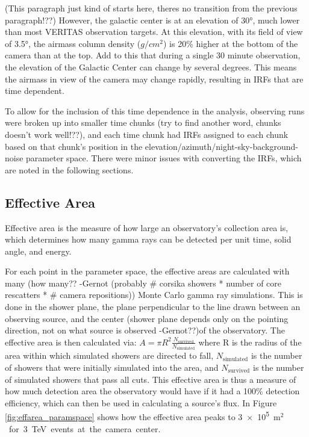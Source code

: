   {\color{red}(This paragraph just kind of starts here, theres no transition from the previous paragraph!??)}
  However, the galactic center is at an elevation of \ang{30}, much lower than most VERITAS observation targets.
  At this elevation, with its field of view of \ang{3.5}, the airmass column density ($g/cm^{2}$) is 20\% higher at the bottom of the camera than at the top.
  Add to this that during a single 30 minute observation, the elevation of the Galactic Center can change by several degrees.
  This means the airmass in view of the camera may change rapidly, resulting in IRFs that are time dependent.

  To allow for the inclusion of this time dependence in the analysis, observing runs were broken up into smaller time {\color{red}chunks (try to find another word, chunks doesn't work well!??)}, and each time chunk had IRFs assigned to each chunk based on that chunk's position in the elevation/azimuth/night-sky-background-noise parameter space.
  There were minor issues with converting the IRFs, which are noted in the following sections.

  \FloatBarrier
  
  \subsection{Effective Area}\label{subsec:effarea}
    Effective area is the measure of how large an observatory's collection area is, which determines how many gamma rays can be detected per unit time, solid angle, and energy.

    For each point in the parameter space, the effective areas are calculated with many {\color{red}(how many?? -Gernot (probably # corsika showers * number of core rescatters * # camera repositions))} Monte Carlo gamma ray simulations.
    This is done in the shower plane, {\color{red} the plane perpendicular to the line drawn between an observing source, and the center (shower plane depends only on the pointing direction, not on what source is observed -Gernot??)}of the observatory.
    The effective area is then calculated via:
    $A=\pi R^2 \frac{N_{\text{survived}}}{N_{\text{simulated}}}$
    where R is the radius of the area within which simulated showers are directed to fall, $N_{\text{simulated}}$ is the number of showers that were initially simulated into the area, and $N_{\text{survived}}$ is the number of simulated showers that pass all cuts.
    This effective area is thus a measure of how much detection area the observatory would have if it had a 100\% detection efficiency, which can then be used in calculating a source's flux.
    In Figure \ref{fig:effarea_paramspace} shows how the effective area peaks to \nicetilde{}\SI{3e5}{m${}^2$} for \SI{3}{\TeV} events at the camera center.

